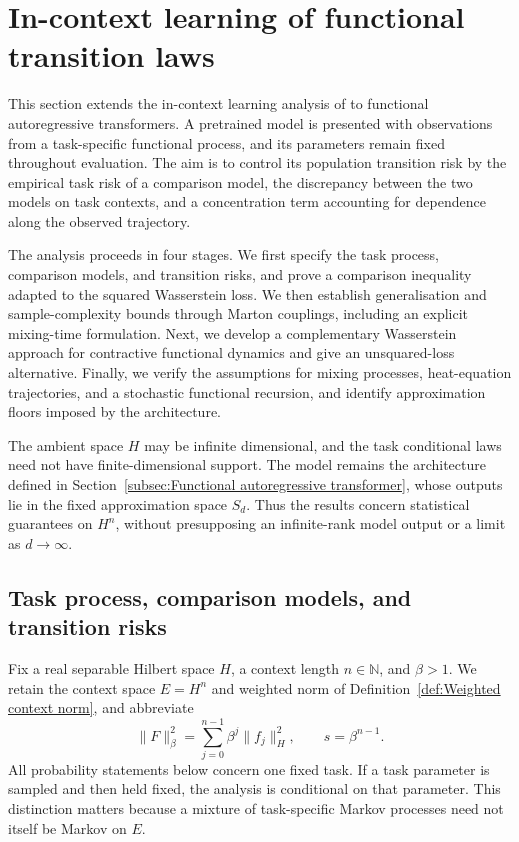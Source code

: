 \section{In-context learning of functional transition laws}
\label{sec:In-context learning}

This section extends the in-context learning analysis of \cite[Sections~6.1--6.2]{ZekriEtAl2025} to functional autoregressive transformers. A pretrained model is presented with observations from a task-specific functional process, and its parameters remain fixed throughout evaluation. The aim is to control its population transition risk by the empirical task risk of a comparison model, the discrepancy between the two models on task contexts, and a concentration term accounting for dependence along the observed trajectory.

The analysis proceeds in four stages. We first specify the task process, comparison models, and transition risks, and prove a comparison inequality adapted to the squared Wasserstein loss. We then establish generalisation and sample-complexity bounds through Marton couplings, including an explicit mixing-time formulation. Next, we develop a complementary Wasserstein approach for contractive functional dynamics and give an unsquared-loss alternative. Finally, we verify the assumptions for mixing processes, heat-equation trajectories, and a stochastic functional recursion, and identify approximation floors imposed by the architecture.

The ambient space \(H\) may be infinite dimensional, and the task conditional laws need not have finite-dimensional support. The model remains the architecture defined in Section~\ref{subsec:Functional autoregressive transformer}, whose outputs lie in the fixed approximation space \(S_d\). Thus the results concern statistical guarantees on \(H^n\), without presupposing an infinite-rank model output or a limit as \(d\to\infty\).

\subsection{Task process, comparison models, and transition risks}
\label{subsec:ICL setup}

Fix a real separable Hilbert space \(H\), a context length \(n\in\mathbb N\), and \(\beta>1\). We retain the context space \(E=H^n\) and weighted norm of Definition~\ref{def:Weighted context norm}, and abbreviate
\[
\|F\|_\beta^2=\sum_{j=0}^{n-1}\beta^j\|f_j\|_H^2,
\qquad s=\beta^{n-1}.
\]
All probability statements below concern one fixed task. If a task parameter is sampled and then held fixed, the analysis is conditional on that parameter. This distinction matters because a mixture of task-specific Markov processes need not itself be Markov on \(E\).

